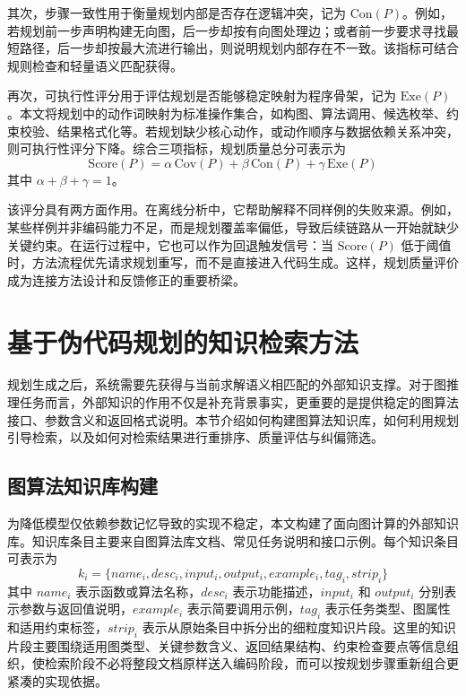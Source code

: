 其次，步骤一致性用于衡量规划内部是否存在逻辑冲突，记为 $\mathrm{Con}(P)$。例如，若规划前一步声明构建无向图，后一步却按有向图处理边；或者前一步要求寻找最短路径，后一步却按最大流进行输出，则说明规划内部存在不一致。该指标可结合规则检查和轻量语义匹配获得。

再次，可执行性评分用于评估规划是否能够稳定映射为程序骨架，记为 $\mathrm{Exe}(P)$。本文将规划中的动作词映射为标准操作集合，如构图、算法调用、候选枚举、约束校验、结果格式化等。若规划缺少核心动作，或动作顺序与数据依赖关系冲突，则可执行性评分下降。综合三项指标，规划质量总分可表示为
\begin{equation}
\mathrm{Score}(P)=\alpha\,\mathrm{Cov}(P)+\beta\,\mathrm{Con}(P)+\gamma\,\mathrm{Exe}(P)
\end{equation}
其中 $\alpha+\beta+\gamma=1$。

该评分具有两方面作用。在离线分析中，它帮助解释不同样例的失败来源。例如，某些样例并非编码能力不足，而是规划覆盖率偏低，导致后续链路从一开始就缺少关键约束。在运行过程中，它也可以作为回退触发信号：当 $\mathrm{Score}(P)$ 低于阈值时，方法流程优先请求规划重写，而不是直接进入代码生成。这样，规划质量评价成为连接方法设计和反馈修正的重要桥梁。

\section{基于伪代码规划的知识检索方法}

规划生成之后，系统需要先获得与当前求解语义相匹配的外部知识支撑。对于图推理任务而言，外部知识的作用不仅是补充背景事实，更重要的是提供稳定的图算法接口、参数含义和返回格式说明。本节介绍如何构建图算法知识库，如何利用规划引导检索，以及如何对检索结果进行重排序、质量评估与纠偏筛选。

\subsection{图算法知识库构建}

为降低模型仅依赖参数记忆导致的实现不稳定，本文构建了面向图计算的外部知识库。知识库条目主要来自图算法库文档、常见任务说明和接口示例。每个知识条目可表示为
\begin{equation}
k_i=\{name_i, desc_i, input_i, output_i, example_i, tag_i, strip_i\}
\end{equation}
其中 $name_i$ 表示函数或算法名称，$desc_i$ 表示功能描述，$input_i$ 和 $output_i$ 分别表示参数与返回值说明，$example_i$ 表示简要调用示例，$tag_i$ 表示任务类型、图属性和适用约束标签，$strip_i$ 表示从原始条目中拆分出的细粒度知识片段。这里的知识片段主要围绕适用图类型、关键参数含义、返回结果结构、约束检查要点等信息组织，使检索阶段不必将整段文档原样送入编码阶段，而可以按规划步骤重新组合更紧凑的实现依据。

